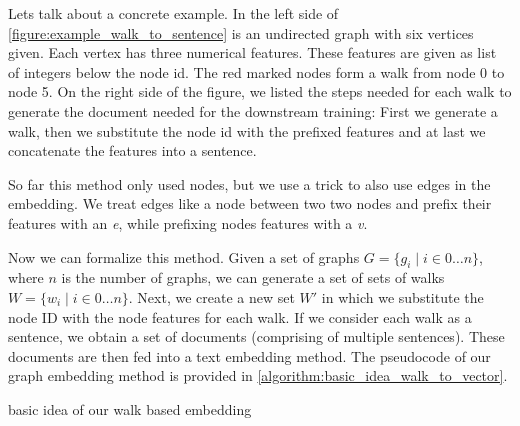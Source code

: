 Lets talk about a concrete example. In the left side of \autoref{figure:example_walk_to_sentence} is an undirected graph with six vertices given. Each vertex has three numerical features. These features are given as list of integers below the node id. The red marked nodes form a walk from node 0 to node 5. On the right side of the figure, we listed the steps needed for each walk to generate the document needed for the downstream training: First we generate a walk, then we substitute the node id with the prefixed features and at last we concatenate the features into a sentence.

So far this method only used nodes, but we use a trick to also use edges in the embedding. We treat edges like a node between two two nodes and prefix their features with an \emph{e}, while prefixing nodes features with a \emph{v}.

Now we can formalize this method. Given a set of graphs $G = \{ g_i \mid i \in 0 \dots n \}$, where $n$ is the number of graphs, we can generate a set of sets of walks $W = \{ w_i \mid i \in 0 \dots n \}$. Next, we create a new set $W'$ in which we substitute the node ID with the node features for each walk. If we consider each walk as a sentence, we obtain a set of documents (comprising of multiple sentences). These documents are then fed into a text embedding method. The pseudocode of our graph embedding method is provided in \autoref{algorithm:basic_idea_walk_to_vector}.

\begin{minipage}{\linewidth}
    \begin{algorithm}[H]
        \DontPrintSemicolon



        \caption{basic idea of our walk based embedding}
        \label{algorithm:basic_idea_walk_to_vector}
    \end{algorithm}
\end{minipage}


